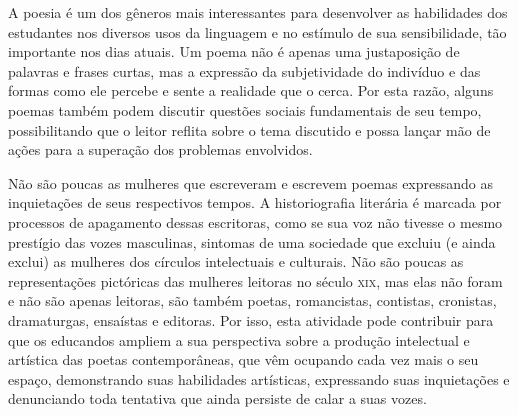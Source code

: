 \documentclass[12pt]{extarticle}
\begin{document}
A poesia é um dos gêneros mais interessantes para desenvolver as
habilidades dos estudantes nos diversos usos da linguagem e no estímulo
de sua sensibilidade, tão importante nos dias atuais. Um poema não é
apenas uma justaposição de palavras e frases curtas, mas a expressão da
subjetividade do indivíduo e das formas como ele percebe e sente a
realidade que o cerca. Por esta razão, alguns poemas também podem
discutir questões sociais fundamentais de seu tempo, possibilitando que
o leitor reflita sobre o tema discutido e possa lançar mão de ações para
a superação dos problemas envolvidos.

Não são poucas as mulheres que escreveram e escrevem poemas expressando
as inquietações de seus respectivos tempos. A historiografia literária é
marcada por processos de apagamento dessas escritoras, como se sua voz
não tivesse o mesmo prestígio das vozes masculinas, sintomas de uma
sociedade que excluiu (e ainda exclui) as mulheres dos círculos
intelectuais e culturais. Não são poucas as representações pictóricas
das mulheres leitoras no século \textsc{xix}, mas elas não foram e não são apenas
leitoras, são também poetas, romancistas, contistas, cronistas,
dramaturgas, ensaístas e editoras. Por isso, esta atividade pode
contribuir para que os educandos ampliem a sua perspectiva sobre a
produção intelectual e artística das poetas contemporâneas, que vêm
ocupando cada vez mais o seu espaço, demonstrando suas habilidades
artísticas, expressando suas inquietações e denunciando toda tentativa
que ainda persiste de calar a suas vozes.
\end{document}
